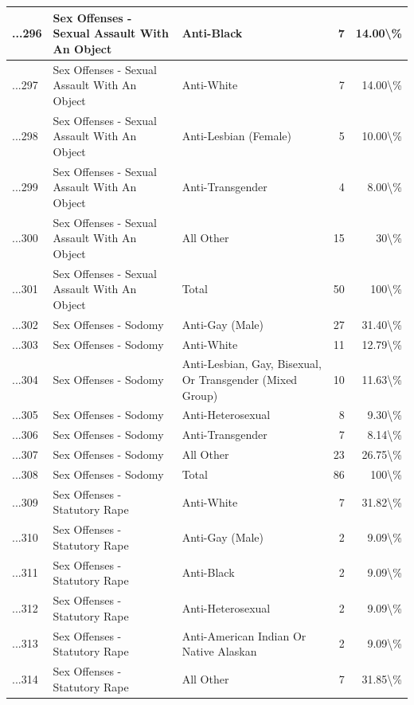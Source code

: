 \documentclass[
]{krantz}
\begin{document}
\begin{longtable}[t]{l|l|l|r|r}
...296 & Sex Offenses - Sexual Assault With An Object & Anti-Black & 7 & 14.00\textbackslash{}\%\\
\hline
...297 & Sex Offenses - Sexual Assault With An Object & Anti-White & 7 & 14.00\textbackslash{}\%\\
\hline
...298 & Sex Offenses - Sexual Assault With An Object & Anti-Lesbian (Female) & 5 & 10.00\textbackslash{}\%\\
\hline
...299 & Sex Offenses - Sexual Assault With An Object & Anti-Transgender & 4 & 8.00\textbackslash{}\%\\
\hline
...300 & Sex Offenses - Sexual Assault With An Object & All Other & 15 & 30\textbackslash{}\%\\
\hline
...301 & Sex Offenses - Sexual Assault With An Object & Total & 50 & 100\textbackslash{}\%\\
\hline
...302 & Sex Offenses - Sodomy & Anti-Gay (Male) & 27 & 31.40\textbackslash{}\%\\
\hline
...303 & Sex Offenses - Sodomy & Anti-White & 11 & 12.79\textbackslash{}\%\\
\hline
...304 & Sex Offenses - Sodomy & Anti-Lesbian, Gay, Bisexual, Or Transgender (Mixed Group) & 10 & 11.63\textbackslash{}\%\\
\hline
...305 & Sex Offenses - Sodomy & Anti-Heterosexual & 8 & 9.30\textbackslash{}\%\\
\hline
...306 & Sex Offenses - Sodomy & Anti-Transgender & 7 & 8.14\textbackslash{}\%\\
\hline
...307 & Sex Offenses - Sodomy & All Other & 23 & 26.75\textbackslash{}\%\\
\hline
...308 & Sex Offenses - Sodomy & Total & 86 & 100\textbackslash{}\%\\
\hline
...309 & Sex Offenses - Statutory Rape & Anti-White & 7 & 31.82\textbackslash{}\%\\
\hline
...310 & Sex Offenses - Statutory Rape & Anti-Gay (Male) & 2 & 9.09\textbackslash{}\%\\
\hline
...311 & Sex Offenses - Statutory Rape & Anti-Black & 2 & 9.09\textbackslash{}\%\\
\hline
...312 & Sex Offenses - Statutory Rape & Anti-Heterosexual & 2 & 9.09\textbackslash{}\%\\
\hline
...313 & Sex Offenses - Statutory Rape & Anti-American Indian Or Native Alaskan & 2 & 9.09\textbackslash{}\%\\
\hline
...314 & Sex Offenses - Statutory Rape & All Other & 7 & 31.85\textbackslash{}\%\\

\end{longtable}
\end{document}
